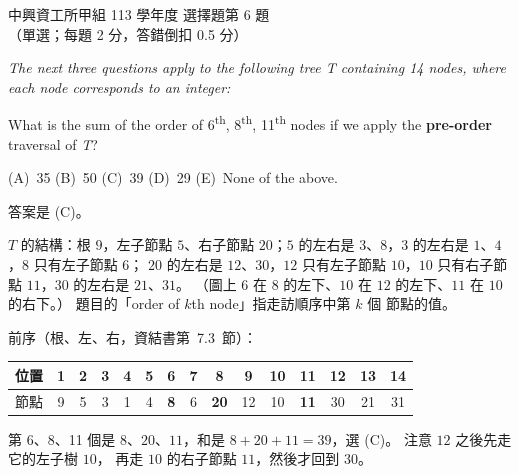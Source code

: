 \begin{pastexam}[label={px:nchu-113-dsa-06}]{中興資工所甲組 113 學年度 選擇題第 6 題}
（單選；每題 2 分，答錯倒扣 0.5 分）

\textit{The next three questions apply to the following tree T containing 14 nodes, where each node
corresponds to an integer:}

\begin{center}
\end{center}

What is the sum of the order of 6\textsuperscript{th}, 8\textsuperscript{th}, 11\textsuperscript{th} nodes if we apply the \textbf{pre-order} traversal of \textit{T}?

(A)~35 \qquad (B)~50 \qquad (C)~39 \qquad (D)~29 \qquad (E)~None of the above.
\end{pastexam}

\begin{pastsoln}
答案是 (C)。

$T$ 的結構：根 $9$，左子節點 $5$、右子節點 $20$；$5$ 的左右是 $3$、$8$，$3$ 的左右是 $1$、$4$，$8$ 只有左子節點 $6$；
$20$ 的左右是 $12$、$30$，$12$ 只有左子節點 $10$，$10$ 只有右子節點 $11$，$30$ 的左右是 $21$、$31$。 （圖上 $6$
在 $8$ 的左下、$10$ 在 $12$ 的左下、$11$ 在 $10$ 的右下。） 題目的「order of $k$th node」指走訪順序中第 $k$ 個
節點的值。

前序（根、左、右，資結書第~7.3~節）：
\begin{center}
\small
\begin{tabular}{l*{14}{c}}
\toprule
位置 & 1 & 2 & 3 & 4 & 5 & 6 & 7 & 8 & 9 & 10 & 11 & 12 & 13 & 14 \\
\midrule
節點 & 9 & 5 & 3 & 1 & 4 & \textbf{8} & 6 & \textbf{20} & 12 & 10 & \textbf{11} & 30 & 21 & 31 \\
\bottomrule
\end{tabular}
\end{center}
第 6、8、11 個是 $8$、$20$、$11$，和是 $8 + 20 + 11 = 39$，選 (C)。 注意 $12$ 之後先走它的左子樹 $10$，
再走 $10$ 的右子節點 $11$，然後才回到 $30$。
\end{pastsoln}
